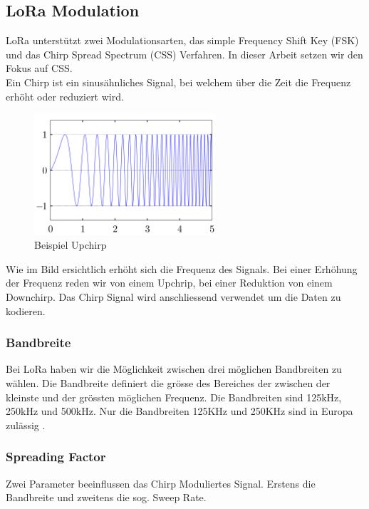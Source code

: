 \documentclass[11pt,english,german]{report}
\theoremstyle{definition}
\begin{document}
\subsection{LoRa Modulation}
LoRa unterstützt zwei Modulationsarten, das simple Frequency Shift Key (FSK) und das Chirp Spread Spectrum (CSS) Verfahren. In dieser Arbeit setzen wir den Fokus auf CSS.\\[0.3cm]
Ein Chirp ist ein sinusähnliches Signal, bei welchem über die Zeit die Frequenz erhöht oder reduziert wird.
\begin{figure}[H]
	\centering
	\includegraphics[width=0.6\textwidth]{img/lora/upchirp.png}
	\caption[Beispiel Upchirp]
	{Beispiel Upchirp}
\end{figure}
\noindent
Wie im Bild ersichtlich erhöht sich die Frequenz des Signals. Bei einer Erhöhung der Frequenz reden wir von einem Upchrip, bei einer Reduktion von einem Downchirp. Das Chirp Signal wird anschliessend verwendet um die Daten zu kodieren.

\subsubsection{Bandbreite}
Bei LoRa haben wir die Möglichkeit zwischen drei möglichen Bandbreiten zu wählen. Die Bandbreite definiert die grösse des Bereiches der zwischen der kleinste und der grössten möglichen Frequenz. Die Bandbreiten sind 125kHz, 250kHz und 500kHz. Nur die Bandbreiten 125KHz und 250KHz sind in Europa zulässig \cite{lorabandwitdh}. 

\newpage
\subsubsection{Spreading Factor}
Zwei Parameter beeinflussen das Chirp Moduliertes Signal. Erstens die Bandbreite und zweitens die sog. Sweep Rate.
\end{document}
